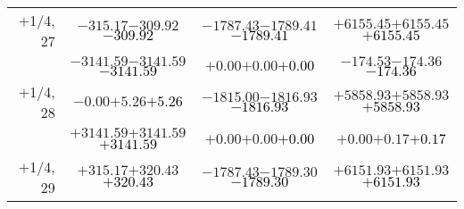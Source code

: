 \documentclass[compress]{beamer}
\begin{document}
\begin{frame}
{\begin{tabular}{r | c | c | c}
$+$1/4, 27 & $-315.17$\hspace{0.1 cm}$-309.92$\hspace{0.1 cm}\textcolor{black}{$-309.92$} & $-1787.43$\hspace{0.1 cm}$-1789.41$\hspace{0.1 cm}\textcolor{black}{$-1789.41$} & $+6155.45$\hspace{0.1 cm}$+6155.45$\hspace{0.1 cm}\textcolor{black}{$+6155.45$} \\
           & $-3141.59$\hspace{0.1 cm}$-3141.59$\hspace{0.1 cm}\textcolor{black}{$-3141.59$} & $+0.00$\hspace{0.1 cm}$+0.00$\hspace{0.1 cm}\textcolor{black}{$+0.00$} & $-174.53$\hspace{0.1 cm}$-174.36$\hspace{0.1 cm}\textcolor{black}{$-174.36$} \\
$+$1/4, 28 & $-0.00$\hspace{0.1 cm}$+5.26$\hspace{0.1 cm}\textcolor{black}{$+5.26$} & $-1815.00$\hspace{0.1 cm}$-1816.93$\hspace{0.1 cm}\textcolor{black}{$-1816.93$} & $+5858.93$\hspace{0.1 cm}$+5858.93$\hspace{0.1 cm}\textcolor{black}{$+5858.93$} \\
           & $+3141.59$\hspace{0.1 cm}$+3141.59$\hspace{0.1 cm}\textcolor{black}{$+3141.59$} & $+0.00$\hspace{0.1 cm}$+0.00$\hspace{0.1 cm}\textcolor{black}{$+0.00$} & $+0.00$\hspace{0.1 cm}$+0.17$\hspace{0.1 cm}\textcolor{black}{$+0.17$} \\
$+$1/4, 29 & $+315.17$\hspace{0.1 cm}$+320.43$\hspace{0.1 cm}\textcolor{black}{$+320.43$} & $-1787.43$\hspace{0.1 cm}$-1789.30$\hspace{0.1 cm}\textcolor{black}{$-1789.30$} & $+6151.93$\hspace{0.1 cm}$+6151.93$\hspace{0.1 cm}\textcolor{black}{$+6151.93$} \\

\end{tabular}}
\end{frame}
\end{document}

